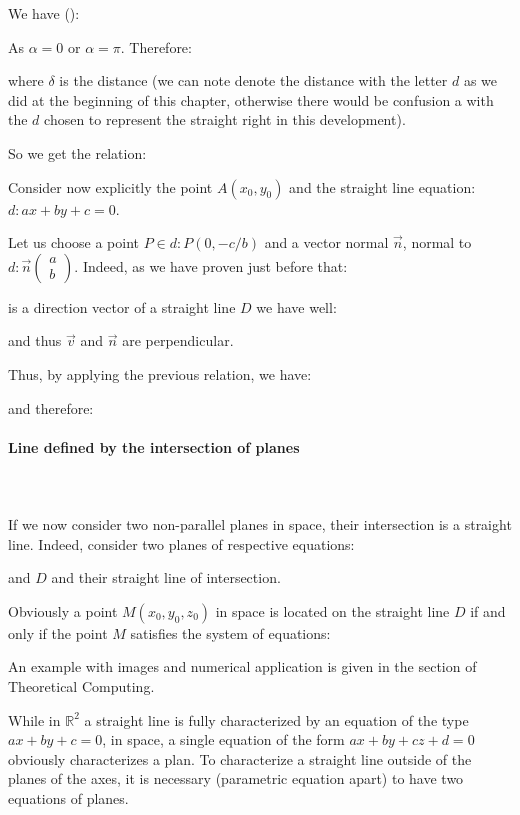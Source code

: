 	We have ():
	
	As $\alpha=0$ or $\alpha=\pi$. Therefore:
	
	where $\delta$ is the distance (we can note denote the distance with the letter $d$ as we did at the beginning of this chapter, otherwise there would be confusion a with the $d$ chosen to represent the straight right in this development).
	
	So we get the relation:
	
	Consider now explicitly the point $A(x_0,y_0)$ and the straight line equation: $d:ax+by+c=0$.
	
	Let us choose a point $P\in d:P(0,-c/b)$ and a vector normal $\vec{n}$, normal to $d:\vec{n}\begin{pmatrix}a \\ b\end{pmatrix}$. Indeed, as we have proven just before that:
	
	is a direction vector of a straight line $D$ we have well:
	
	and thus $\vec{v}$ and $\vec{n}$ are perpendicular.
	
	Thus, by applying the previous relation, we have:
	
	and therefore:
	
	
	\paragraph{Line defined by the intersection of planes}\mbox{}\\\\
	If we now consider two non-parallel planes in space, their intersection is a straight line. Indeed, consider two planes of respective equations:
	
	and $D$ and their straight line of intersection.
	
	Obviously a point $M(x_0,y_0,z_0)$ in space is located on the straight line $D$ if and only if the point $M$ satisfies the system of equations:
	
	An example with images and numerical application is given in the section of Theoretical Computing.
	\begin{tcolorbox}[title=Remark,colframe=black,arc=10pt]
	While in $\mathbb{R}^2$ a straight line is fully characterized by an equation of the type $ax+by+c=0$, in space, a single equation of the form $ax+by+cz+d=0$ obviously characterizes a plan. To characterize a straight line outside of the planes of the axes, it is necessary (parametric equation apart) to have two equations of planes.
	\end{tcolorbox}	
	
